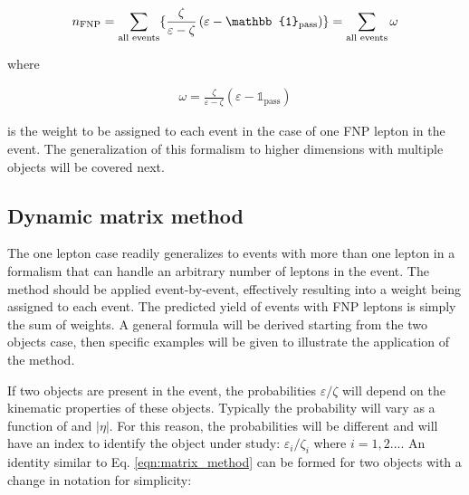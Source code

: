 \[
n_\text{FNP} = \sum_\text{all events} \{
\frac{\zeta}{\varepsilon - \zeta}\left(\varepsilon - 
\mathbb{1}_\text{pass}\right)
\}
\\
=  \sum_\text{all events} \omega
\]

where 

\begin{align}
  \omega = \frac{\zeta}{\varepsilon - \zeta}\left(\varepsilon - 
\mathbb{1}_\text{pass}\right)
  \label{eqn:fake.nFNPpass.demo}
\end{align}

is the weight to be assigned to each event in the case of one FNP lepton 
in the event. 
The generalization of this formalism to higher dimensions 
with multiple objects will be covered next.



\subsection{Dynamic matrix method}


The one lepton case readily generalizes to events with more than one lepton
in a formalism that can handle an arbitrary number of leptons 
in the event. The method should be applied event-by-event, effectively 
resulting into a weight being assigned to each event. The predicted yield of 
events with FNP leptons is simply the sum of weights.
A general formula will be derived starting from the two objects case, 
then specific examples will be given to illustrate the application of the 
method.

If two objects are present in the event, the probabilities $\varepsilon/\zeta$
will depend on the kinematic properties of these objects. Typically 
the probability will vary as a function of \pt and $|\eta|$. For this reason,
the probabilities will be different and will have an index to 
identify the object under study: 
 $\varepsilon_i/\zeta_i$ where $i=1,2...$. 
An identity similar to Eq.  \ref{eqn:matrix_method} can be formed for 
two objects with a change in notation for simplicity:

